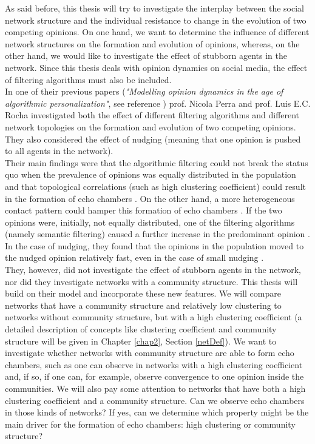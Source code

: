\documentclass[11 pt , letterpaper , twoside , openright]{book}
\begin{document}
As said before, this thesis will try to investigate the interplay between the social network structure and the individual resistance to change in the evolution of two competing opinions. On one hand, we want to determine the influence of different network structures on the formation and evolution of opinions, whereas, on the other hand, we would like to investigate the effect of stubborn agents in the network. Since this thesis deals with opinion dynamics on social media, the effect of filtering algorithms must also be included.\\ 
\newline
In one of their previous papers (\textit{"Modelling opinion dynamics in the age of algorithmic personalization"}, see reference \cite{Perra2019}) prof. Nicola Perra and prof. Luis E.C. Rocha investigated both the effect of different filtering algorithms and different network topologies on the formation and evolution of two competing opinions. They also considered the effect of nudging (meaning that one opinion is pushed to all agents in the network).\\ Their main findings were that the algorithmic filtering could not break the status quo when the prevalence of opinions was equally distributed in the population and that topological correlations (such as high clustering coefficient) could result in the formation of echo chambers \cite{Perra2019}. On the other hand, a more heterogeneous contact pattern could hamper this formation of echo chambers \cite{Perra2019}. If the two opinions were, initially, not equally distributed, one of the filtering algorithms (namely semantic filtering) caused a further increase in the predominant opinion \cite{Perra2019}. In the case of nudging, they found that the opinions in the population moved to the nudged opinion relatively fast, even in the case of small nudging \cite{Perra2019}.\\
They, however, did not investigate the effect of stubborn agents in the network, nor did they investigate networks with a community structure. This thesis will build on their model and incorporate these new features. We will compare networks that have a community structure and relatively low clustering to networks without community structure, but with a high clustering coefficient (a detailed description of concepts like clustering coefficient and community structure will be given in Chapter \ref{chap2}, Section \ref{netDef}). We want to investigate whether networks with community structure are able to form echo chambers, such as one can observe in networks with a high clustering coefficient and, if so, if one can, for example, observe convergence to one opinion inside the communities. We will also pay some attention to networks that have both a high clustering coefficient and a community structure. Can we observe echo chambers in those kinds of networks? If yes, can we determine which property might be the main driver for the formation of echo chambers: high clustering or community structure? \\
\end{document}
